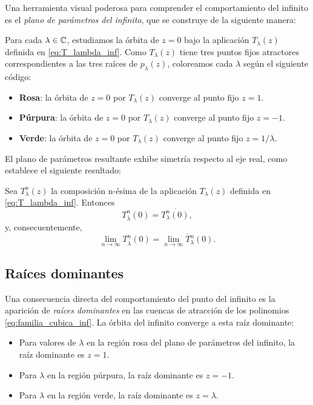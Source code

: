 Una herramienta visual poderosa para comprender el comportamiento del infinito es el \emph{plano de parámetros del infinito}, que se construye de la siguiente manera:

Para cada $\lambda\in\mathbb{C}$, estudiamos la órbita de $z=0$ bajo la aplicación $T_\lambda(z)$ definida en \eqref{eq:T_lambda_inf}. Como $T_\lambda(z)$ tiene tres puntos fijos atractores correspondientes a las tres raíces de $p_\lambda(z)$, coloreamos cada $\lambda$ según el siguiente código:

\begin{itemize}
\item \textbf{Rosa}: la órbita de $z=0$ por $T_\lambda(z)$ converge al punto fijo $z=1$.
\item \textbf{Púrpura}: la órbita de $z=0$ por $T_\lambda(z)$ converge al punto fijo $z=-1$.
\item \textbf{Verde}: la órbita de $z=0$ por $T_\lambda(z)$ converge al punto fijo $z=1/\lambda$.
\end{itemize}



El plano de parámetros resultante exhibe simetría respecto al eje real, como establece el siguiente resultado:

\begin{teorema}
Sea $T^n_\lambda(z)$ la composición n-ésima de la aplicación $T_\lambda(z)$ definida en \eqref{eq:T_lambda_inf}. Entonces
$$
T^n_{\overline{\lambda}}(0)=\overline{T^n_\lambda(0)},
$$
y, consecuentemente,
$$
\lim_{n\to\infty}T^n_{\overline{\lambda}}(0)=\overline{\lim_{n\to\infty}T^n_\lambda(0)}.
$$
\end{teorema}

\subsection{Raíces dominantes}

Una consecuencia directa del comportamiento del punto del infinito es la aparición de \emph{raíces dominantes} en las cuencas de atracción de los polinomios \eqref{eq:familia_cubica_inf}. La órbita del infinito converge a esta raíz dominante:

\begin{itemize}
\item Para valores de $\lambda$ en la región rosa del plano de parámetros del infinito, la raíz dominante es $z=1$.
\item Para $\lambda$ en la región púrpura, la raíz dominante es $z=-1$.
\item Para $\lambda$ en la región verde, la raíz dominante es $z=\lambda$.
\end{itemize}

